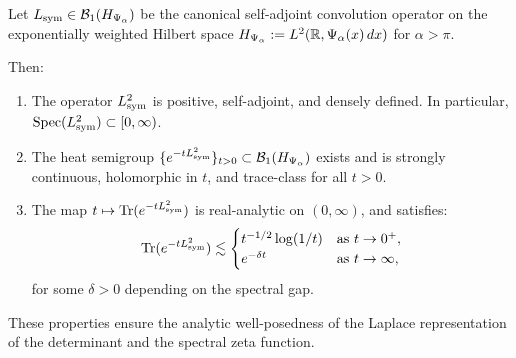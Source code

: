 \begin{lemma}
\label{lem:heat_semigroup_existence}
Let \( L_{\mathrm{sym}} \in \mathcal{B}_1(H_{\Psi_\alpha}) \) be the canonical self-adjoint convolution operator on the exponentially weighted Hilbert space \( H_{\Psi_\alpha} := L^2(\mathbb{R}, \Psi_\alpha(x)\, dx) \) for \( \alpha > \pi \).

Then:
\begin{enumerate}
  \item[\textnormal{(i)}] The operator \( L_{\mathrm{sym}}^2 \) is positive, self-adjoint, and densely defined. In particular, \( \operatorname{Spec}(L_{\mathrm{sym}}^2) \subset [0, \infty) \).

  \item[\textnormal{(ii)}] The heat semigroup \( \{e^{-t L_{\mathrm{sym}}^2}\}_{t > 0} \subset \mathcal{B}_1(H_{\Psi_\alpha}) \) exists and is strongly continuous, holomorphic in \( t \), and trace-class for all \( t > 0 \).

  \item[\textnormal{(iii)}] The map \( t \mapsto \operatorname{Tr}(e^{-t L_{\mathrm{sym}}^2}) \) is real-analytic on \( (0, \infty) \), and satisfies:
  \[
  \operatorname{Tr}(e^{-t L_{\mathrm{sym}}^2}) \lesssim
  \begin{cases}
    t^{-1/2} \log(1/t) & \text{as } t \to 0^+, \\
    e^{-\delta t} & \text{as } t \to \infty,
  \end{cases}
  \]
  for some \( \delta > 0 \) depending on the spectral gap.
\end{enumerate}

\medskip
\noindent
These properties ensure the analytic well-posedness of the Laplace representation of the determinant and the spectral zeta function.
\end{lemma}
